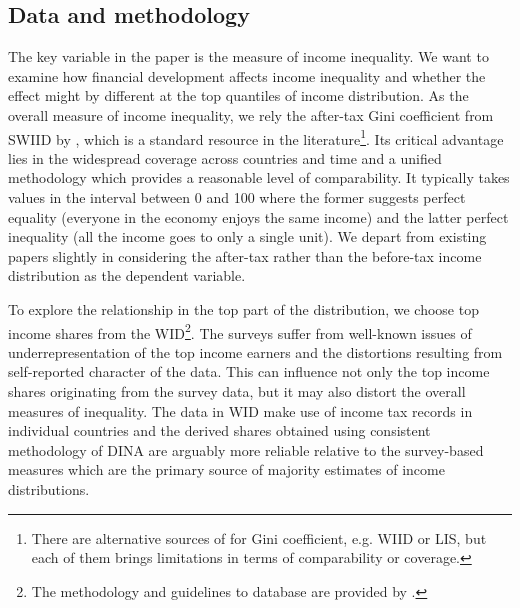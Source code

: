 \begin{refsection}

%
%
%
%
%

\section{Data and methodology}
The key variable in the paper is the measure of income inequality. We want to examine how financial development affects income inequality and whether the effect might by different at the top quantiles of income distribution. As the overall measure of income inequality, we rely the after-tax Gini coefficient from \ac{SWIID} by \textcite{Solt2019}, which is a standard resource in the literature\footnote{There are alternative sources of for Gini coefficient, e.g. \ac{WIID} or \ac{LIS}, but each of them brings limitations in terms of comparability or coverage.}. Its critical advantage lies in the widespread coverage across countries and time and a unified methodology which provides a reasonable level of comparability. It typically takes values in the interval between 0 and 100 where the former suggests perfect equality (everyone in the economy enjoys the same income) and the latter perfect inequality (all the income goes to only a single unit). We depart from existing papers slightly in considering the after-tax rather than the before-tax income distribution as the dependent variable. 

To explore the relationship in the top part of the distribution, we choose top income shares from the \ac{WID}\footnote{The methodology and guidelines to database are provided by \textcite{alvaredo2016distributional}.}. The surveys suffer from well-known issues of underrepresentation of the top income earners and the distortions resulting from self-reported character of the data. This can influence not only the top income shares originating from the survey data, but it may also distort the overall measures of inequality. The data in \ac{WID} make use of income tax records in individual countries and the derived shares obtained using consistent methodology of \ac{DINA} are arguably more reliable relative to the survey-based measures which are the primary source of majority estimates of income distributions. 


\end{refsection}
